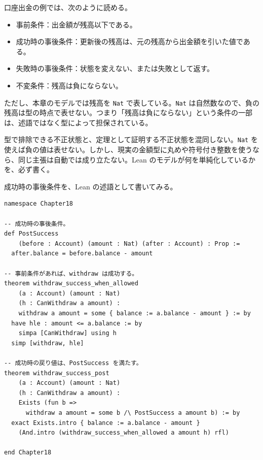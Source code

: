 口座出金の例では、次のように読める。

\begin{itemize}
\item 事前条件：出金額が残高以下である。
\item 成功時の事後条件：更新後の残高は、元の残高から出金額を引いた値である。
\item 失敗時の事後条件：状態を変えない、または失敗として返す。
\item 不変条件：残高は負にならない。
\end{itemize}

ただし、本章のモデルでは残高を \texttt{Nat} で表している。\texttt{Nat} は自然数なので、負の残高は型の時点で表せない。つまり「残高は負にならない」という条件の一部は、述語ではなく型によって担保されている。

\begin{warningbox}
型で排除できる不正状態と、定理として証明する不正状態を混同しない。\texttt{Nat} を使えば負の値は表せない。しかし、現実の金額型に丸めや符号付き整数を使うなら、同じ主張は自動では成り立たない。Lean のモデルが何を単純化しているかを、必ず書く。
\end{warningbox}

成功時の事後条件を、Lean の述語として書いてみる。

\begin{listing}[htbp]
\begin{verbatim}
namespace Chapter18

-- 成功時の事後条件。
def PostSuccess
    (before : Account) (amount : Nat) (after : Account) : Prop :=
  after.balance = before.balance - amount

-- 事前条件があれば、withdraw は成功する。
theorem withdraw_success_when_allowed
    (a : Account) (amount : Nat)
    (h : CanWithdraw a amount) :
    withdraw a amount = some { balance := a.balance - amount } := by
  have hle : amount <= a.balance := by
    simpa [CanWithdraw] using h
  simp [withdraw, hle]

-- 成功時の戻り値は、PostSuccess を満たす。
theorem withdraw_success_post
    (a : Account) (amount : Nat)
    (h : CanWithdraw a amount) :
    Exists (fun b =>
      withdraw a amount = some b /\ PostSuccess a amount b) := by
  exact Exists.intro { balance := a.balance - amount }
    (And.intro (withdraw_success_when_allowed a amount h) rfl)

end Chapter18
\end{verbatim}
\caption{事後条件と小さな証明}
\label{lst:ch18-postcondition}
\end{listing}

